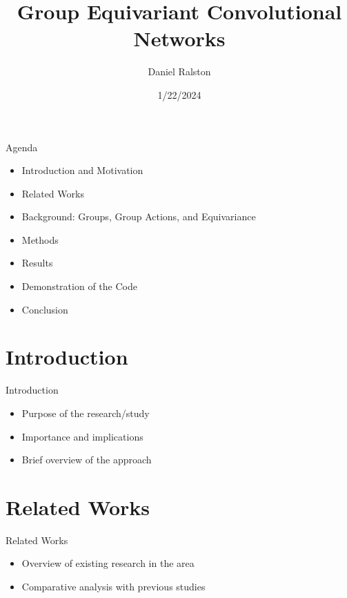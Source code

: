 \documentclass{beamer}
\title{Group Equivariant Convolutional Networks}
\author{Daniel Ralston}
\date{1/22/2024}
\begin{document}
\begin{frame}
  \titlepage
\end{frame}

\begin{frame}{Agenda}
    \begin{itemize}
        \item Introduction and Motivation
        \item Related Works
        \item Background: Groups, Group Actions, and Equivariance
        \item Methods
        \item Results
        \item Demonstration of the Code
        \item Conclusion
    \end{itemize}
\end{frame}

\section{Introduction}
\begin{frame}{Introduction}
    \begin{itemize}
        \item Purpose of the research/study
        \item Importance and implications
        \item Brief overview of the approach
    \end{itemize}
\end{frame}

\section{Related Works}
\begin{frame}{Related Works}
    \begin{itemize}
        \item Overview of existing research in the area
        \item Comparative analysis with previous studies
    \end{itemize}
\end{frame}

\end{document}
